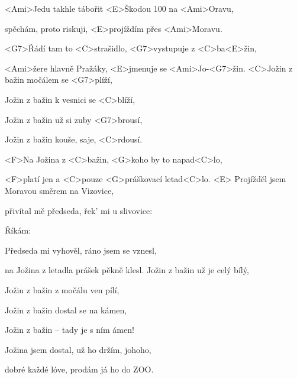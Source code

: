
\zs
<Ami>Jedu takhle tábořit <E>Škodou 100 na <Ami>Oravu,

spěchám, proto riskuji, <E>projíždím přes <Ami>Moravu.

<G7>Řádí tam to <C>strašidlo, <G7>vystupuje z <C>ba<E>žin,

<Ami>žere hlavně Pražáky, <E>jmenuje se <Ami>Jo-<G7>žin.
\ks
\zr
<C>Jožin z bažin močálem se <G7>plíží,

Jožin z bažin k vesnici se <C>blíží,

Jožin z bažin už si zuby <G7>brousí,

Jožin z bažin kouše, saje, <C>rdousí.

<F>Na Jožina z <C>bažin, <G>koho by to napad<C>lo,

<F>platí jen a <C>pouze <G>práškovací letad<C>lo. <E>
\kr
\zs
Projížděl jsem Moravou směrem na Vizovice,

přivítal mě předseda, řek' mi u slivovice:

\ks
\zr \kr
\zs
Říkám: 

Předseda mi vyhověl, ráno jsem se vznesl,

na Jožina z letadla prášek pěkně klesl.
\ks
\zr
Jožin z bažin už je celý bílý,

Jožin z bažin z močálu ven pílí,

Jožin z bažin dostal se na kámen,

Jožin z bažin -- tady je s ním ámen!

Jožina jsem dostal, už ho držím, johoho,

dobré každé lóve, prodám já ho do ZOO.
\kr
\kp






